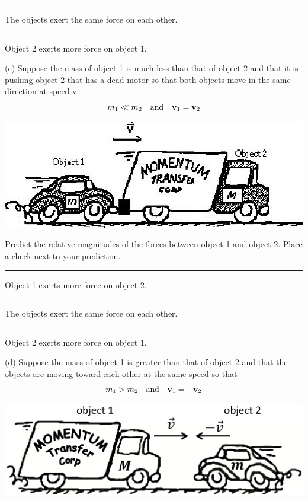 \rule{0.5in}{0.1pt} The objects exert the same force on each other.

\rule{0.5in}{0.1pt} Object 2 exerts more force on object 1.

(c) Suppose the mass of object 1 is much less than that of object 2 and that
it is pushing object 2 that has a dead motor so that both objects move in the
same direction at speed v.
\[
m_{1}\ll m_{2}\quad \mbox{and}\quad {{\bf v}_{1}}={{\bf v}_{2}}\]


\vspace{0.3cm}
{\par\centering \includegraphics{newtons_laws/newtons_laws_fig3.eps} \par}
\vspace{0.3cm}

Predict the relative magnitudes of the forces between object 1 and object 2.
Place a check next to your prediction. 

\rule{0.5in}{0.1pt} Object 1 exerts more force on object 2. 

\rule{0.5in}{0.1pt} The objects exert the same force on each other. 

\rule{0.5in}{0.1pt} Object 2 exerts more force on object 1.

(d) Suppose the mass of object 1 is greater than that of object 2 and that the
objects are moving toward each other at the same speed so that
\[
m_{1}>m_{2}\quad \mbox{and}\quad {{\bf v}_{1}}=-{{\bf v}_{2}}\]


{\par\centering \includegraphics{newtons_laws/newtons_laws_fig4_new.eps} \par}

